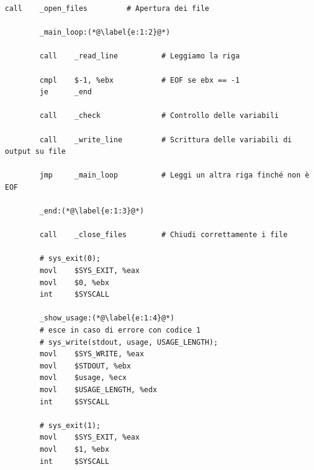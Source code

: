 \documentclass[a4paper,11pt]{article}
\begin{document}
\begin{lstlisting}[language=MyAssembler, style=MyAsm]
		call    _open_files         # Apertura dei file
		
		_main_loop:(*@\label{e:1:2}@*)
		
		call    _read_line          # Leggiamo la riga
		
		cmpl    $-1, %ebx           # EOF se ebx == -1
		je      _end
		
		call    _check              # Controllo delle variabili
		
		call    _write_line         # Scrittura delle variabili di output su file
		
		jmp     _main_loop          # Leggi un altra riga finché non è EOF
		
		_end:(*@\label{e:1:3}@*)
		
		call    _close_files        # Chiudi correttamente i file
		
		# sys_exit(0);
		movl    $SYS_EXIT, %eax
		movl    $0, %ebx
		int     $SYSCALL
		
		_show_usage:(*@\label{e:1:4}@*)
		# esce in caso di errore con codice 1
		# sys_write(stdout, usage, USAGE_LENGTH);
		movl    $SYS_WRITE, %eax
		movl    $STDOUT, %ebx
		movl    $usage, %ecx
		movl    $USAGE_LENGTH, %edx
		int     $SYSCALL
		
		# sys_exit(1);
		movl    $SYS_EXIT, %eax
		movl    $1, %ebx
		int     $SYSCALL
		
		\end{lstlisting}
		
\end{document}
